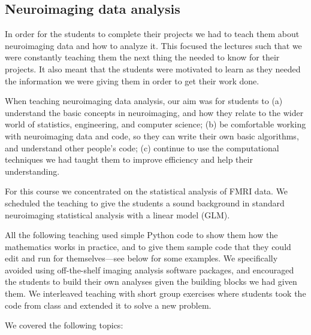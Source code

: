 %
\subsection{Neuroimaging data analysis}\label{analysis}

In order for the students to complete their projects we had to
teach them about neuroimaging data and how to analyze it.
This focused the lectures such that we were constantly teaching
them the next thing the needed to know for their projects.
It also meant that the students were motivated to learn as
they needed the information we were giving them in order
to get their work done.

When teaching neuroimaging data analysis, our aim was for students to
(a) understand the basic concepts in neuroimaging,
and how they relate to the wider world of statistics, engineering, and computer science;
(b) be comfortable working with neuroimaging data and code, so they can write
their own basic algorithms, and understand other people's code;
(c) continue to use the computational techniques we had taught them to improve
efficiency and help their understanding.

For this course we concentrated on the statistical analysis of FMRI data.  We
scheduled the teaching to give the students a sound background in standard
neuroimaging statistical analysis with a linear model (GLM).

All the following teaching used simple Python code to show them how the
mathematics works in practice, and to give them sample code that they could
edit and run for themselves---see below for some examples.  We specifically
avoided using off-the-shelf imaging analysis software packages, and encouraged
the students to build their own analyses given the building blocks we had
given them.  We interleaved teaching with short group exercises where students
took the code from class and extended it to solve a new problem.

We covered the following topics:

